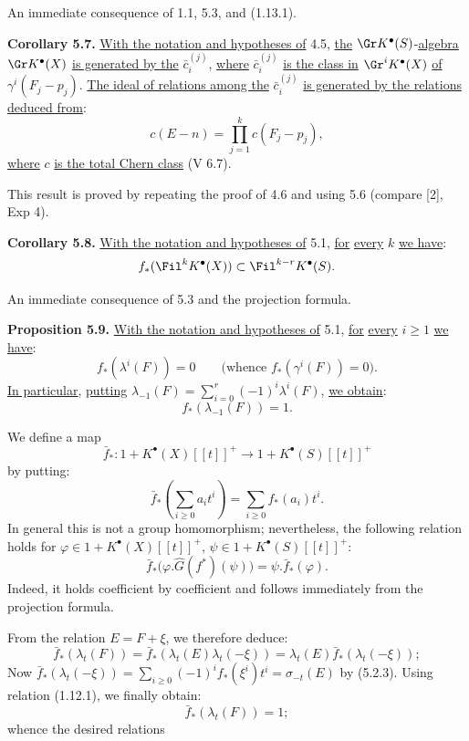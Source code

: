 An immediate consequence of 1.1, 5.3, and (1.13.1).

\textbf{Corollary 5.7.} \uline{With the notation and hypotheses of} 4.5, \uline{the} $\Gr K^{\bullet}(S)$-\uline{algebra} $\Gr K^{\bullet}(X)$ \uline{is generated by the} $\bar c_i^{(j)}$, \uline{where} $\bar c_i^{(j)}$ \uline{is the class in} $\Gr^iK^{\bullet}(X)$ \uline{of} $\gamma^i(F_j-p_j)$. \uline{The ideal of relations among the} $\bar c_i^{(j)}$ \uline{is generated by the relations deduced from}:
\[
  c(E-n)=\prod_{j=1}^{k}c(F_j-p_j),
\]
%
\uline{where} $c$ \uline{is the total Chern class} (V 6.7).

This result is proved by repeating the proof of 4.6 and using 5.6 (compare [2], Exp 4).

\textbf{Corollary 5.8.} \uline{With the notation and hypotheses of} 5.1, \uline{for} \uline{every} $k$ \uline{we have}:
\[
  f_*(\Fil^kK^{\bullet}(X))\subset \Fil^{k-r}K^{\bullet}(S).
\]

An immediate consequence of 5.3 and the projection formula.

\textbf{Proposition 5.9.} \uline{With the notation and hypotheses of} 5.1, \uline{for} \uline{every} $i\ge 1$ \uline{we have}:
\[
  f_*(\lambda^i(F))=0\qquad\bigl(\text{whence }f_*(\gamma^i(F))=0\bigr).
\]
\uline{In particular}, \uline{putting} $\lambda_{-1}(F)=\sum_{i=0}^{r}(-1)^i\lambda^i(F)$, \uline{we obtain}:
\[
  f_*(\lambda_{-1}(F))=1.
\]

We define a map
\[
  \bar f_*:1+K^{\bullet}(X)[[t]]^+\longrightarrow 1+K^{\bullet}(S)[[t]]^+
\]
by putting:
\[
  \bar f_*\left(\sum_{i\ge0}a_it^i\right)=\sum_{i\ge0}f_*(a_i)t^i .
\]
In general this is not a group homomorphism; nevertheless, the following relation holds for $\varphi\in 1+K^{\bullet}(X)[[t]]^+$, $\psi\in 1+K^{\bullet}(S)[[t]]^+$:
\[
  \bar f_*\bigl(\varphi.\hat G(f^*)(\psi)\bigr)=\psi.\bar f_*(\varphi).
\]
Indeed, it holds coefficient by coefficient and follows immediately from the projection formula.

From the relation $E=F+\xi$, we therefore deduce:
%
\[
  \bar f_*(\lambda_t(F))=
  \bar f_*(\lambda_t(E)\lambda_t(-\xi))=
  \lambda_t(E)\bar f_*(\lambda_t(-\xi));
\]
Now $\bar f_*(\lambda_t(-\xi))=\sum_{i\ge0}(-1)^if_*(\xi^i)t^i=\sigma_{-t}(E)$ by (5.2.3).
Using relation (1.12.1), we finally obtain:
\[
  \bar f_*(\lambda_t(F))=1;
\]
whence the desired relations

